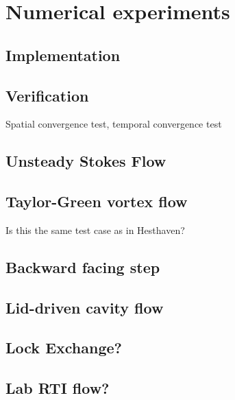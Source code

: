 \section{Numerical experiments}
\label{sec:numerical_experiments}

\subsection{Implementation}

\subsection{Verification}
Spatial convergence test, temporal convergence test

\subsection{Unsteady Stokes Flow}

\subsection{Taylor-Green vortex flow}
Is this the same test case as in Hesthaven?

\subsection{Backward facing step}

\subsection{Lid-driven cavity flow}

\subsection{Lock Exchange?}
\subsection{Lab RTI flow?}
